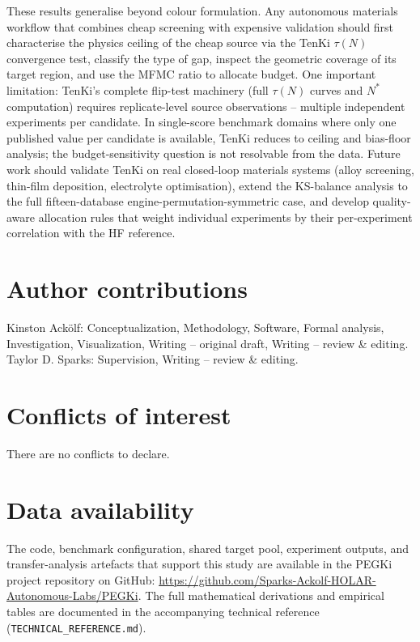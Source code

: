 \documentclass[twoside,twocolumn,9pt]{article}
\begin{document}
These results generalise beyond colour formulation. Any autonomous materials workflow that combines cheap screening with expensive validation should first characterise the physics ceiling of the cheap source via the TenKi $\tau(N)$ convergence test, classify the type of gap, inspect the geometric coverage of its target region, and use the MFMC ratio to allocate budget.\cite{Peherstorfer2018SurveyMF,KennedyOHagan2000CoKriging} One important limitation: TenKi's complete flip-test machinery (full $\tau(N)$ curves and $N^*$ computation) requires replicate-level source observations -- multiple independent experiments per candidate. In single-score benchmark domains where only one published value per candidate is available, TenKi reduces to ceiling and bias-floor analysis; the budget-sensitivity question is not resolvable from the data. Future work should validate TenKi on real closed-loop materials systems (alloy screening, thin-film deposition, electrolyte optimisation), extend the KS-balance analysis to the full fifteen-database engine-permutation-symmetric case, and develop quality-aware allocation rules that weight individual experiments by their per-experiment correlation with the HF reference.

\section*{Author contributions}
Kinston Ack{\"o}lf: Conceptualization, Methodology, Software, Formal analysis, Investigation, Visualization, Writing -- original draft, Writing -- review \& editing. Taylor D. Sparks: Supervision, Writing -- review \& editing.

\section*{Conflicts of interest}
There are no conflicts to declare.

\section*{Data availability}
The code, benchmark configuration, shared target pool, experiment outputs, and transfer-analysis artefacts that support this study are available in the PEGKi project repository on GitHub: \url{https://github.com/Sparks-Ackolf-HOLAR-Autonomous-Labs/PEGKi}. The full mathematical derivations and empirical tables are documented in the accompanying technical reference (\texttt{TECHNICAL\_REFERENCE.md}).
\end{document}
